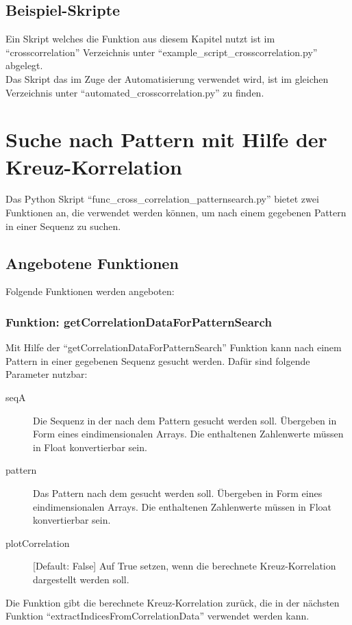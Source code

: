 \section{Beispiel-Skripte}
Ein Skript welches die Funktion aus diesem Kapitel nutzt ist im \enquote{crosscorrelation} Verzeichnis unter \enquote{example\_script\_crosscorrelation.py} abgelegt.\\
Das Skript das im Zuge der Automatisierung verwendet wird, ist im gleichen Verzeichnis unter \enquote{automated\_crosscorrelation.py} zu finden.



\chapter{Suche nach Pattern mit Hilfe der Kreuz-Korrelation}
Das Python Skript \enquote{func\_cross\_correlation\_patternsearch.py} bietet zwei Funktionen an, die verwendet werden können, 
um nach einem gegebenen Pattern in einer Sequenz zu suchen.

\section{Angebotene Funktionen}
Folgende Funktionen werden angeboten:

\subsection{Funktion: getCorrelationDataForPatternSearch}
Mit Hilfe der \enquote{getCorrelationDataForPatternSearch} Funktion kann nach einem Pattern in einer gegebenen Sequenz gesucht werden. Dafür sind folgende Parameter nutzbar:
\begin{description}
    \item[seqA] Die Sequenz in der nach dem Pattern gesucht werden soll. Übergeben in Form eines eindimensionalen Arrays. Die enthaltenen Zahlenwerte müssen in Float konvertierbar sein.
    \item[pattern] Das Pattern nach dem gesucht werden soll. Übergeben in Form eines eindimensionalen Arrays. Die enthaltenen Zahlenwerte müssen in Float konvertierbar sein.
    \item[plotCorrelation] [Default: False] Auf True setzen, wenn die berechnete Kreuz-Korrelation dargestellt werden soll.
\end{description}
Die Funktion gibt die berechnete Kreuz-Korrelation zurück, die in der nächsten Funktion \enquote{extractIndicesFromCorrelationData} verwendet werden kann.

